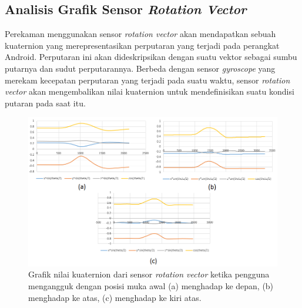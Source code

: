 \subsection{Analisis Grafik Sensor \textit{Rotation Vector}}
\label{sec:analisis_grafik_sensor_rotation_vector}

Perekaman menggunakan sensor \textit{rotation vector} akan mendapatkan sebuah kuaternion yang merepresentasikan perputaran yang terjadi pada perangkat Android. Perputaran ini akan dideskripsikan dengan suatu vektor sebagai sumbu putarnya dan sudut perputarannya. Berbeda dengan sensor \textit{gyroscope} yang merekam kecepatan perputaran yang terjadi pada suatu waktu, sensor \textit{rotation vector} akan mengembalikan nilai kuaternion untuk mendefinisikan suatu kondisi putaran pada saat itu. 

\begin{figure}[htbp]
\centering
\includegraphics[scale=0.7]{Gambar/grafik-sensor-rot-vector-mengangguk.png}
\caption{Grafik nilai kuaternion dari sensor \textit{rotation vector} ketika pengguna mengangguk dengan posisi muka awal (a) menghadap ke depan, (b) menghadap ke atas, (c) menghadap ke kiri atas.} 
\label{fig:grafik-sensor-rot-vector-mengangguk}
\end{figure}

